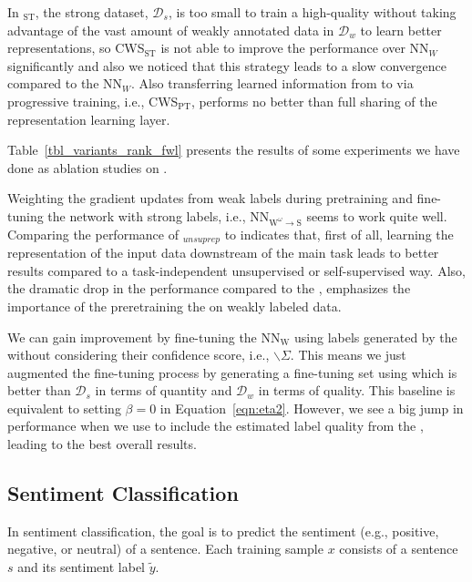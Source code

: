 In \cws$_\text{ST}$,  the strong dataset, $\mathcal{D}_s$, is too small to train a high-quality \cnet without taking advantage of the vast amount of weakly annotated data in $\mathcal{D}_w$ to learn better representations, so CWS$_\text{ST}$ is not able to improve the performance over $\text{NN}_W$ significantly and also we noticed that this strategy leads to a slow convergence compared to the $\text{NN}_W$. 
Also transferring learned information from \tnet to \cnet via progressive training, i.e., CWS$_\text{PT}$, performs no better than full sharing of the representation learning layer.




Table~\ref{tbl_variants_rank_fwl} presents the results of some experiments we have done as ablation studies on \fwl. 

Weighting the gradient updates from weak labels during pretraining and fine-tuning the network with strong labels, i.e., NN$_{\text{W}^\omega \to \text{S}}$ seems to work quite well.
%
Comparing the performance of \fwlnospace$_{unsuprep}$ to \fwl indicates that, first of all, learning the representation of the input data downstream of the main task leads to better results compared to a task-independent unsupervised or self-supervised way. Also, the dramatic drop in the performance compared to the \fwl, emphasizes the importance of the preretraining the \std on weakly labeled data.

%
We can gain improvement by fine-tuning the NN$_\text{W}$ using labels generated by the \tch without considering their confidence score, i.e., \fwl$\backslash\Sigma$. This means we just augmented the fine-tuning process by generating a fine-tuning set using \tch which is better than $\mathcal{D}_s$ in terms of quantity and $\mathcal{D}_w$ in terms of quality. This baseline is equivalent to setting $\beta = 0$ in Equation~\ref{eqn:eta2}. However, we see a big jump in performance when we use \fwl to include the estimated label quality from the \tch, leading to the best overall results.

\subsection{Sentiment Classification}
In sentiment classification, the goal is to predict the sentiment (e.g., positive, negative, or neutral) of a sentence. Each training sample $x$ consists of a sentence $s$ and its sentiment label $\tilde{y}$.

